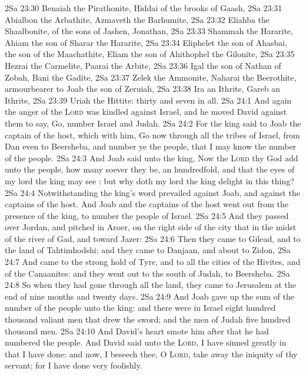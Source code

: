 \vs 2Sa 23:30 Benaiah the Pirathonite, Hiddai of the brooks of Gaash,
\vs 2Sa 23:31 Abialbon the Arbathite, Azmaveth the Barhumite,
\vs 2Sa 23:32 Eliahba the Shaalbonite, of the sons of Jashen, Jonathan,
\vs 2Sa 23:33 Shammah the Hararite, Ahiam the son of Sharar the Hararite,
\vs 2Sa 23:34 Eliphelet the son of Ahasbai, the son of the Maachathite, Eliam the son of Ahithophel the Gilonite,
\vs 2Sa 23:35 Hezrai the Carmelite, Paarai the Arbite,
\vs 2Sa 23:36 Igal the son of Nathan of Zobah, Bani the Gadite,
\vs 2Sa 23:37 Zelek the Ammonite, Naharai the Beerothite, armourbearer to Joab the son of Zeruiah,
\vs 2Sa 23:38 Ira an Ithrite, Gareb an Ithrite,
\vs 2Sa 23:39 Uriah the Hittite: thirty and seven in all.
\vs 2Sa 24:1 And again the anger of the \textsc{Lord} was kindled against Israel, and he moved David against them to say, Go, number Israel and Judah.
\vs 2Sa 24:2 For the king said to Joab the captain of the host, which  with him, Go now through all the tribes of Israel, from Dan even to Beersheba, and number ye the people, that I may know the number of the people.
\vs 2Sa 24:3 And Joab said unto the king, Now the \textsc{Lord} thy God add unto the people, how many soever they be, an hundredfold, and that the eyes of my lord the king may see : but why doth my lord the king delight in this thing?
\vs 2Sa 24:4 Notwithstanding the king's word prevailed against Joab, and against the captains of the host. And Joab and the captains of the host went out from the presence of the king, to number the people of Israel.
\vs 2Sa 24:5 And they passed over Jordan, and pitched in Aroer, on the right side of the city that  in the midst of the river of Gad, and toward Jazer:
\vs 2Sa 24:6 Then they came to Gilead, and to the land of Tahtimhodshi; and they came to Danjaan, and about to Zidon,
\vs 2Sa 24:7 And came to the strong hold of Tyre, and to all the cities of the Hivites, and of the Canaanites: and they went out to the south of Judah,  to Beersheba.
\vs 2Sa 24:8 So when they had gone through all the land, they came to Jerusalem at the end of nine months and twenty days.
\vs 2Sa 24:9 And Joab gave up the sum of the number of the people unto the king: and there were in Israel eight hundred thousand valiant men that drew the sword; and the men of Judah  five hundred thousand men.
\vs 2Sa 24:10 And David's heart smote him after that he had numbered the people. And David said unto the \textsc{Lord}, I have sinned greatly in that I have done: and now, I beseech thee, O \textsc{Lord}, take away the iniquity of thy servant; for I have done very foolishly.
